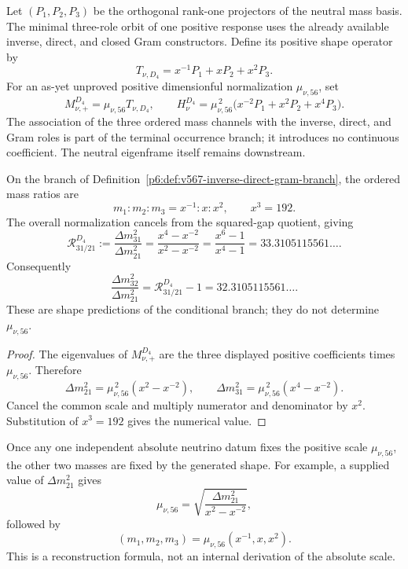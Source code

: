 \documentclass[12pt,a4paper]{article}
\begin{document}
\begin{definition}
\label{p6:def:v567-inverse-direct-gram-branch}
Let \((P_1,P_2,P_3)\) be the orthogonal rank-one projectors of the neutral
mass basis.  The minimal three-role orbit of one positive response uses the
already available inverse, direct, and closed Gram constructors.  Define its
positive shape operator by
\[
 \boxed{
 T_{\nu,D_4}
 =x^{-1}P_1+xP_2+x^2P_3 .}
\]
For an as-yet unproved positive dimensionful normalization \(\mu_{\nu,56}\),
set
\[
 \boxed{
 M_{\nu,+}^{D_4}=\mu_{\nu,56}T_{\nu,D_4},\qquad
 H_\nu^{D_4}=\mu_{\nu,56}^{\,2}
 \bigl(x^{-2}P_1+x^2P_2+x^4P_3\bigr).}
\]
The association of the three ordered mass channels with the inverse, direct,
and Gram roles is part of the terminal occurrence branch; it introduces no
continuous coefficient.  The neutral eigenframe itself remains downstream.
\end{definition}

\begin{theorem}
\label{p6:thm:v567-d4-scale-free-neutrino-shape}
On the branch of Definition~\ref{p6:def:v567-inverse-direct-gram-branch}, the
ordered mass ratios are
\[
 \boxed{m_1:m_2:m_3=x^{-1}:x:x^2,
 \qquad x^3=192.}
\]
The overall normalization cancels from the squared-gap quotient, giving
\[
 \boxed{
 \mathcal R_{31/21}^{D_4}
 :=\frac{\Delta m_{31}^2}{\Delta m_{21}^2}
 =\frac{x^4-x^{-2}}{x^2-x^{-2}}
 =\frac{x^6-1}{x^4-1}
 =33.3105115561\ldots .}
\]
Consequently
\[
 \frac{\Delta m_{32}^2}{\Delta m_{21}^2}
 =\mathcal R_{31/21}^{D_4}-1
 =32.3105115561\ldots .
\]
These are shape predictions of the conditional branch; they do not determine
\(\mu_{\nu,56}\).
\end{theorem}

\begin{proof}
The eigenvalues of \(M_{\nu,+}^{D_4}\) are the three displayed positive
coefficients times \(\mu_{\nu,56}\).  Therefore
\[
 \Delta m_{21}^2=\mu_{\nu,56}^{\,2}(x^2-x^{-2}),\qquad
 \Delta m_{31}^2=\mu_{\nu,56}^{\,2}(x^4-x^{-2}).
\]
Cancel the common scale and multiply numerator and denominator by \(x^2\).
Substitution of \(x^3=192\) gives the numerical value.
\end{proof}

\begin{corollary}
\label{p6:cor:v567-one-scale-reconstruction}
Once any one independent absolute neutrino datum fixes the positive scale
\(\mu_{\nu,56}\), the other two masses are fixed by the generated shape.  For
example, a supplied value of \(\Delta m_{21}^2\) gives
\[
 \mu_{\nu,56}
 =\sqrt{\frac{\Delta m_{21}^2}{x^2-x^{-2}}},
\]
followed by
\[
 (m_1,m_2,m_3)
 =\mu_{\nu,56}(x^{-1},x,x^2).
\]
This is a reconstruction formula, not an internal derivation of the absolute
scale.
\end{corollary}
\end{document}
